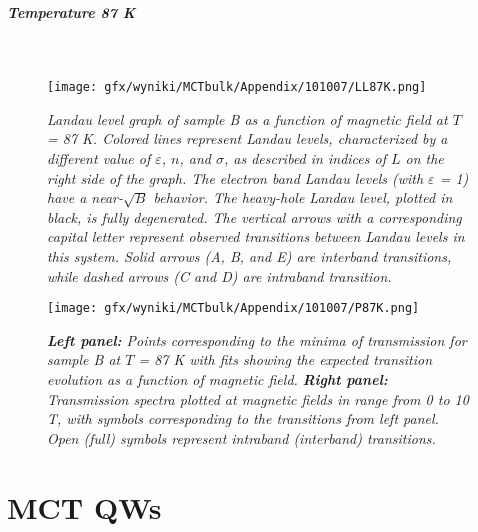 \documentclass[titlepage,a4paper]{book}
\newcommand{\myparagraph}[1]{\paragraph{#1}\mbox{}\\}
\begin{document}
\myparagraph{Temperature 87 K}
\begin{figure}[H]
	\centering
	\texttt{[image: gfx/wyniki/MCTbulk/Appendix/101007/LL87K.png]}
	\vspace{-10pt}
	\caption{\textit{Landau level graph of sample B as a function of magnetic field at $T$ = 87 K. Colored lines represent Landau levels, characterized by a different value of $\varepsilon$, $n$, and $\sigma$, as described in indices of $L$ on the right side of the graph. The electron band Landau levels (with $\varepsilon$ = 1) have a near-$\sqrt{B}$ behavior. The heavy-hole Landau level, plotted in black, is fully degenerated. The vertical arrows with a corresponding capital letter represent observed transitions between Landau levels in this system. Solid arrows (A, B, and E) are interband transitions, while dashed arrows (C and D) are intraband transition.}}
	\label{fig:LL_101007_87K}
\end{figure}

\begin{figure}[H]
	\centering
	\texttt{[image: gfx/wyniki/MCTbulk/Appendix/101007/P87K.png]}
	\vspace{-10pt}
	\caption{\textit{\textbf{Left panel:} Points corresponding to the minima of transmission for sample B at $T$ = 87 K with fits showing the expected transition evolution as a function of magnetic field. \textbf{Right panel:} Transmission spectra plotted at magnetic fields in range from 0 to 10 T, with symbols corresponding to the transitions from left panel. Open (full) symbols represent intraband (interband) transitions.}}
	\label{fig:Spectra_101007_87K}
\end{figure}  



\chapter{MCT QWs}
\label{Appendix_QW}
\end{document}
